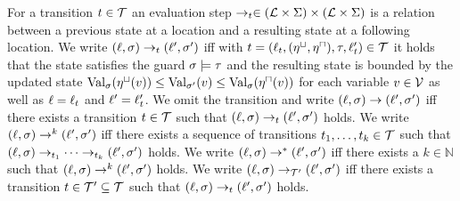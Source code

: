 \begin{definition}[Evaluation] 
  For a transition $t \in \TSet$ an evaluation step $\rightarrow_t \in (\LSet \times \Sigma) \times (\LSet \times \Sigma)$ is a relation between a previous state at a location and a resulting state at a following location.
  We write $(\location, \valuation) \rightarrow_t (\location', \valuation')$ iff with $t = (\location_t, (\lupdate, \uupdate), \guard, \location_t') \in \TSet$ it holds that the state satisfies the guard $\valuation \models \guard$ and the resulting state is bounded by the updated state $\exacteval{\lupdate(v)}{\valuation} \leq \exacteval{v}{\valuation'} \leq \exacteval{\uupdate(v)}{\valuation}$ for each variable $v \in \VSet$ as well as $\location = \location_t$ and $\location' = \location_t'$.
  We omit the transition and write $(\location, \valuation) \rightarrow (\location', \valuation')$ iff there exists a transition $t \in \TSet$ such that $(\location, \valuation) \rightarrow_t (\location', \valuation')$ holds.
  We write $(\location, \valuation) \rightarrow^k (\location', \valuation')$ iff there exists a sequence of transitions $t_1, \dots, t_k \in \TSet$ such that $(\location, \valuation) \rightarrow_{t_1} \dots \rightarrow_{t_k} (\location', \valuation')$ holds.
  We write $(\location, \valuation) \rightarrow^* (\location', \valuation')$ iff there exists a $k \in \mathbb{N}$ such that $(\location, \valuation) \rightarrow^k (\location', \valuation')$ holds.
  We write $(\location, \valuation) \rightarrow_{\TSet'} (\location', \valuation')$ iff there exists a transition $t \in \TSet' \subseteq \TSet$ such that $(\location, \valuation) \rightarrow_t (\location', \valuation')$ holds.
\end{definition}
